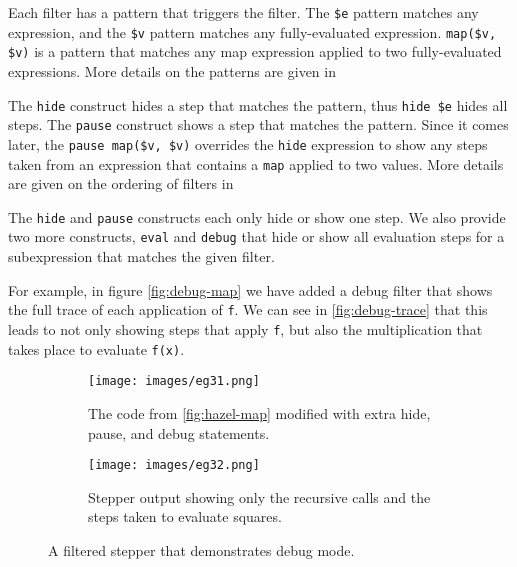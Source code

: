 Each filter has a pattern that triggers the filter. The \verb|$e| pattern matches any expression, and the \verb|$v| pattern matches any fully-evaluated expression. \verb|map($v, $v)| is a pattern that matches any map expression applied to two fully-evaluated expressions. More details on the patterns are given in 

The \verb|hide| construct hides a step that matches the pattern, thus \verb|hide $e| hides all steps. The \verb|pause| construct shows a step that matches the pattern. Since it comes later, the \verb|pause map($v, $v)| overrides the \verb|hide| expression to show any steps taken from an expression that contains a \verb|map| applied to two values. More details are given on the ordering of filters in 

The \verb|hide| and \verb|pause| constructs each only hide or show one step. We also provide two more constructs, \verb|eval| and \verb|debug| that hide or show all evaluation steps for a subexpression that matches the given filter. 

For example, in figure \autoref{fig:debug-map} we have added a debug filter that shows the full trace of each application of \verb|f|. We can see in \autoref{fig:debug-trace} that this leads to not only showing steps that apply \verb|f|, but also the multiplication that takes place to evaluate \verb|f(x)|.


\begin{figure}
    \centering
    \begin{minipage}{.40\linewidth}
    \begin{subfigure}{\linewidth}
        \texttt{[image: images/eg31.png]}
        \caption{The code from \autoref{fig:hazel-map} modified with extra hide, pause, and debug statements.}
        \label{fig:debug-map}
    \end{subfigure}
    \end{minipage}
    \hfill
    \begin{minipage}{.57\linewidth}
    \begin{subfigure}{\linewidth}
        \texttt{[image: images/eg32.png]}
        \caption{Stepper output showing only the recursive calls and the steps taken to evaluate squares.}
        \label{fig:debug-trace}
    \end{subfigure}
    \end{minipage}
    \caption{A filtered stepper that demonstrates debug mode.}
\end{figure}

